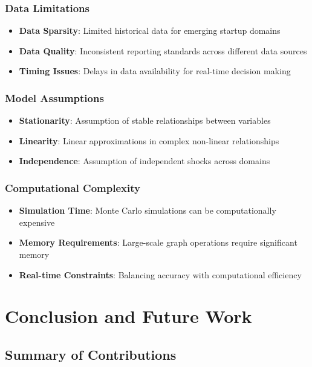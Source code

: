 \subsubsection{Data Limitations}
\begin{itemize}
    \item \textbf{Data Sparsity}: Limited historical data for emerging startup domains
    \item \textbf{Data Quality}: Inconsistent reporting standards across different data sources
    \item \textbf{Timing Issues}: Delays in data availability for real-time decision making
\end{itemize}

\subsubsection{Model Assumptions}
\begin{itemize}
    \item \textbf{Stationarity}: Assumption of stable relationships between variables
    \item \textbf{Linearity}: Linear approximations in complex non-linear relationships
    \item \textbf{Independence}: Assumption of independent shocks across domains
\end{itemize}

\subsubsection{Computational Complexity}
\begin{itemize}
    \item \textbf{Simulation Time}: Monte Carlo simulations can be computationally expensive
    \item \textbf{Memory Requirements}: Large-scale graph operations require significant memory
    \item \textbf{Real-time Constraints}: Balancing accuracy with computational efficiency
\end{itemize}

\section{Conclusion and Future Work}

\subsection{Summary of Contributions}

